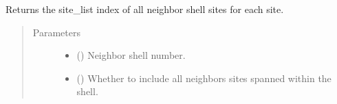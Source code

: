 \documentclass[letterpaper,10pt,english]{sphinxmanual}
\begin{document}
\begin{fulllineitems}
\begin{fulllineitems}
\end{fulllineitems}


\begin{fulllineitems}
\label{\detokenize{modules:acat.adsorption_sites.SlabAdsorptionSites.get_neighbor_site_list}}
Returns the site\_list index of all neighbor shell sites
for each site.
\begin{quote}\begin{description}
\item[{Parameters}] \leavevmode\begin{itemize}
\item {} 
 (\sphinxstyleliteralemphasis{\sphinxupquote{, }}) \textendash{} Neighbor shell number.

\item {} 
 (\sphinxstyleliteralemphasis{\sphinxupquote{, }}) \textendash{} Whether to include all neighbors sites spanned within
the shell.

\end{itemize}

\end{description}\end{quote}

\end{fulllineitems}



\end{fulllineitems}
\end{document}
